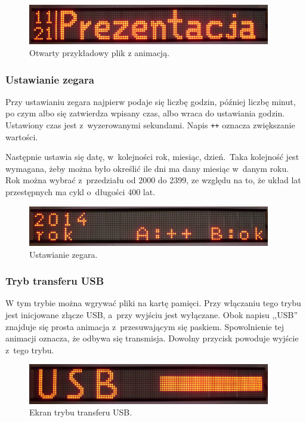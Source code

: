 \begin{figure}[htb]
	\begin{center}
		\includegraphics[width=300pt]{figures/prezentacja.png}
	\end{center}
	\caption{Otwarty przykładowy plik z animacją.}
\end{figure}

\subsubsection*{Ustawianie zegara}
Przy ustawianiu zegara najpierw podaje się liczbę godzin, później liczbę minut, po czym albo się zatwierdza wpisany czas, albo wraca do ustawiania godzin. Ustawiony czas jest z~wyzerowanymi sekundami. Napis \texttt{++} oznacza zwiększanie wartości.

Następnie ustawia się datę, w~kolejności rok, miesiąc, dzień.~Taka kolejność jest wymagana, żeby można było określić ile dni ma dany miesiąc w~danym roku. Rok można wybrać z~przedziału od 2000 do 2399, ze względu na to, że układ lat przestępnych ma cykl o~długości 400 lat.

\begin{figure}[htb]
	\begin{center}
		\includegraphics[width=300pt]{figures/ustawzegar.png}
	\end{center}
	\caption{Ustawianie zegara.}
\end{figure}

\subsubsection*{Tryb transferu USB}
W tym trybie można wgrywać pliki na kartę pamięci. Przy włączaniu tego trybu jest inicjowane złącze USB, a~przy wyjściu jest wyłączane. Obok napisu ,,USB'' znajduje się prosta animacja z~przesuwającym się paskiem. Spowolnienie tej animacji oznacza, że odbywa się transmisja. Dowolny przycisk powoduje wyjście z~tego trybu.

\begin{figure}[htb]
	\begin{center}
		\includegraphics[width=300pt]{figures/trybusb.png}
	\end{center}
	\caption{Ekran trybu transferu USB.}
\end{figure}

